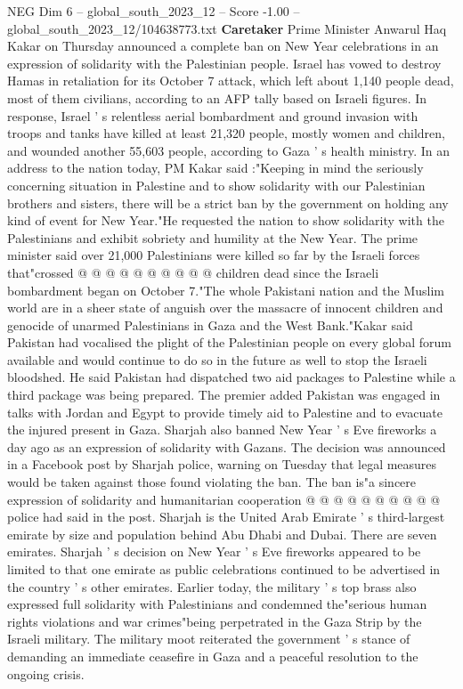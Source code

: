 \begin{textsample}{NEG Dim 6 – global\_south\_2023\_12 – Score -1.00 – global\_south\_2023\_12/104638773.txt}  \label{ex:f6_neg_353}
\textbf{Caretaker} Prime Minister Anwarul Haq Kakar on Thursday announced a complete ban on New Year celebrations in an expression of solidarity with the Palestinian people.
Israel has vowed to destroy Hamas in retaliation for its October 7 attack, which left about 1,140 people dead, most of them civilians, according to an AFP tally based on Israeli figures.
In response, Israel ' s relentless aerial bombardment and ground invasion with troops and tanks have killed at least 21,320 people, mostly women and children, and wounded another 55,603 people, according to Gaza ' s health ministry.
In an address to the nation today, PM Kakar said :"Keeping in mind the seriously concerning situation in Palestine and to show solidarity with our Palestinian brothers and sisters, there will be a strict ban by the government on holding any kind of event for New Year."He requested the nation to show solidarity with the Palestinians and exhibit sobriety and humility at the New Year.
The prime minister said over 21,000 Palestinians were killed so far by the Israeli forces that"crossed @ @ @ @ @ @ @ @ @ @ children dead since the Israeli bombardment began on October 7."The whole Pakistani nation and the Muslim world are in a sheer state of anguish over the massacre of innocent children and genocide of unarmed Palestinians in Gaza and the West Bank."Kakar said Pakistan had vocalised the plight of the Palestinian people on every global forum available and would continue to do so in the future as well to stop the Israeli bloodshed.
He said Pakistan had dispatched two aid packages to Palestine while a third package was being prepared.
The premier added Pakistan was engaged in talks with Jordan and Egypt to provide timely aid to Palestine and to evacuate the injured present in Gaza.
Sharjah also banned New Year ' s Eve fireworks a day ago as an expression of solidarity with Gazans.
The decision was announced in a Facebook post by Sharjah police, warning on Tuesday that legal measures would be taken against those found violating the ban.
The ban is"a sincere expression of solidarity and humanitarian cooperation @ @ @ @ @ @ @ @ @ @ police had said in the post.
Sharjah is the United Arab Emirate ' s third-largest emirate by size and population behind Abu Dhabi and Dubai.
There are seven emirates.
Sharjah ' s decision on New Year ' s Eve fireworks appeared to be limited to that one emirate as public celebrations continued to be advertised in the country ' s other emirates.
Earlier today, the military ' s top brass also expressed full solidarity with Palestinians and condemned the"serious human rights violations and war crimes"being perpetrated in the Gaza Strip by the Israeli military.
The military moot reiterated the government ' s stance of demanding an immediate ceasefire in Gaza and a peaceful resolution to the ongoing crisis.

\end{textsample}
